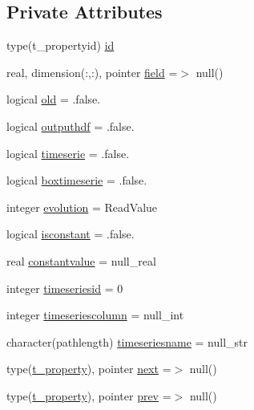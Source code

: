 \subsection*{Private Attributes}
\begin{DoxyCompactItemize}
\item 
type(t\+\_\+propertyid) \mbox{\hyperlink{structmodulevegetation_1_1t__property_add5a50b35d1e98d86e9dba8074cc2771}{id}}
\item 
real, dimension(\+:,\+:), pointer \mbox{\hyperlink{structmodulevegetation_1_1t__property_a3beadc386a44cf0399a03397cd740bf1}{field}} =$>$ null()
\item 
logical \mbox{\hyperlink{structmodulevegetation_1_1t__property_a974dc749fb6bf50d7a1659d52ae82a5a}{old}} = .false.
\item 
logical \mbox{\hyperlink{structmodulevegetation_1_1t__property_a22df4b60d130229f84081ed92c028afd}{outputhdf}} = .false.
\item 
logical \mbox{\hyperlink{structmodulevegetation_1_1t__property_ad0717a6b71f73e1039243c3301299540}{timeserie}} = .false.
\item 
logical \mbox{\hyperlink{structmodulevegetation_1_1t__property_a72221b7dba5b89ce075158c51303c2a7}{boxtimeserie}} = .false.
\item 
integer \mbox{\hyperlink{structmodulevegetation_1_1t__property_ae81f217052cfb88bc70e9bfbdf78b2d8}{evolution}} = Read\+Value
\item 
logical \mbox{\hyperlink{structmodulevegetation_1_1t__property_a82c36be808d80eb7a8a930a2aca4a736}{isconstant}} = .false.
\item 
real \mbox{\hyperlink{structmodulevegetation_1_1t__property_aa9a1fa2df94325bcd2af2c351807bf67}{constantvalue}} = null\+\_\+real
\item 
integer \mbox{\hyperlink{structmodulevegetation_1_1t__property_acf4e1df5349c8e1c9aebda7cb94c8183}{timeseriesid}} = 0
\item 
integer \mbox{\hyperlink{structmodulevegetation_1_1t__property_a6a76a3bf7d9e60eb1e4b27c10e9f9bb2}{timeseriescolumn}} = null\+\_\+int
\item 
character(pathlength) \mbox{\hyperlink{structmodulevegetation_1_1t__property_a70f5fcab244eda0d3cf59a120ab1c942}{timeseriesname}} = null\+\_\+str
\item 
type(\mbox{\hyperlink{structmodulevegetation_1_1t__property}{t\+\_\+property}}), pointer \mbox{\hyperlink{structmodulevegetation_1_1t__property_a482b84bd009d3f6271317bf6b0ded7a4}{next}} =$>$ null()
\item 
type(\mbox{\hyperlink{structmodulevegetation_1_1t__property}{t\+\_\+property}}), pointer \mbox{\hyperlink{structmodulevegetation_1_1t__property_a3a9f2773f0d6f7a513f802981b90c65c}{prev}} =$>$ null()
\end{DoxyCompactItemize}


